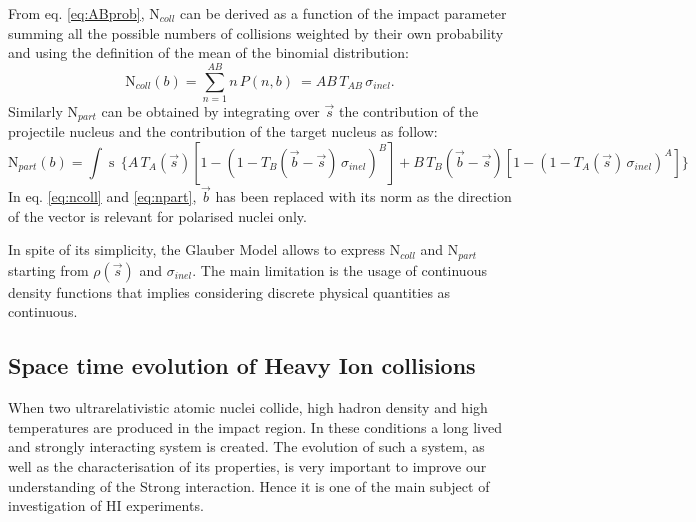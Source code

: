 From eq. \ref{eq:ABprob}, $\mathrm{N}_{coll}$ can be derived as a function of the impact parameter 
summing all the possible numbers of collisions weighted by their own probability and using the
definition of the mean of the binomial distribution:
\begin{equation} \label{eq:ncoll}
    \mathrm{N}_{coll}(b) = \sum_{n=1}^{AB} n\, P(n,b) \ = AB\, T_{AB}\, \sigma_{inel}.
\end{equation}
Similarly $\mathrm{N}_{part}$ can be obtained by integrating over $\vec{s}$ the contribution of the
projectile nucleus and the contribution of the target nucleus as follow:
\begin{equation} \label{eq:npart}
    \mathrm{N}_{part}(b) = \int \mathop{d^{2}s} \, \bigl\{ A\, T_{A}(\vec{s})[1-(1- T_{B}(\vec{b}-\vec{s})\, \sigma_{inel})^{B}
    ] + B\, T_{B}(\vec{b}-\vec{s}) [1-(1-T_{A}(\vec{s})\,\sigma_{inel})^{A}] \bigr\}
\end{equation}
In eq. \ref{eq:ncoll} and \ref{eq:npart}, $\vec{b}$ has been replaced with its norm as the direction 
of the vector is relevant for polarised nuclei only.

In spite of its simplicity, the Glauber Model allows to express $\mathrm{N}_{coll}$ and 
$\mathrm{N}_{part}$ starting from $\rho(\vec{s})$ and $\sigma_{inel}$. The main limitation
is the usage of continuous density functions that implies considering discrete physical quantities 
as continuous.

%
\subsection{Space time evolution of Heavy Ion collisions} \label{sec:1.3.2}

When two ultrarelativistic atomic nuclei collide, high hadron density and high temperatures
are produced in the impact region. 
In these conditions a long lived and strongly interacting system is created.
The evolution of such a system, as well as the characterisation of its properties, is very important
to improve our understanding of the Strong interaction. Hence it is one of the main subject of 
investigation of HI experiments.

